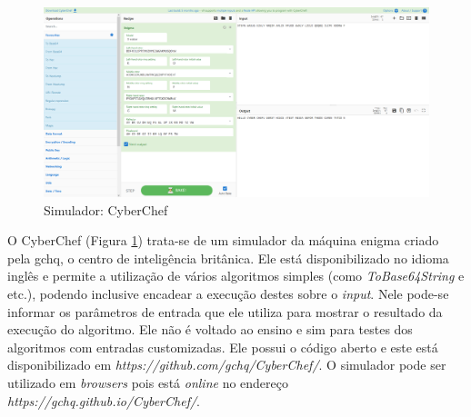 \begin{figure}[H]
    \centering
    \caption{Simulador: CyberChef}
    \label{fig:cyberchef}
    \includegraphics[width=1.2\linewidth,center]{Simuladores/CyberChef_Enigma.png}
\end{figure}

O CyberChef (Figura \ref{fig:cyberchef}) trata-se de um simulador da máquina enigma criado pela \acrfull{gchq}, o centro de inteligência britânica. Ele está disponibilizado no idioma inglês e permite a utilização de vários algoritmos simples (como \textit{ToBase64String} e etc.), podendo inclusive encadear a execução destes sobre o \textit{input}. Nele pode-se informar os parâmetros de entrada que ele utiliza para mostrar o resultado da execução do algoritmo. Ele não é voltado ao ensino e sim para testes dos algoritmos com entradas customizadas. Ele possui o código aberto e este está disponibilizado em \textit{https://github.com/gchq/CyberChef/}. O simulador pode ser utilizado em \textit{browsers} pois está \textit{online} no endereço \textit{https://gchq.github.io/CyberChef/}. \cite{gchq20}



